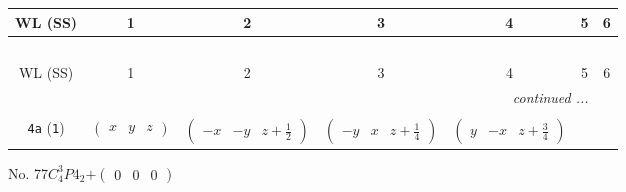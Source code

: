 \documentclass[fleqn,9pt,landscape]{jsarticle}
\begin{document}
\begin{center}
\renewcommand{\arraystretch}{1.2}
\begin{longtable}{ccccccc}
 \hline \hline
WL (SS) & 1 & 2 & 3 & 4 & 5 & 6 \\ \hline \endfirsthead

\multicolumn{6}{l}{\tablename\ \thetable{}} \\
 \hline \hline
WL (SS) & 1 & 2 & 3 & 4 & 5 & 6 \\ \hline \endhead

 \hline \hline
\multicolumn{6}{r}{\footnotesize\it continued ...} \\ \endfoot

 \hline \hline
\multicolumn{6}{r}{} \\ \endlastfoot

{\tt 4a} ({\tt 1}) & $ \begin{pmatrix} x & y & z \end{pmatrix} $ & $ \begin{pmatrix} - x & - y & z + \frac{1}{2} \end{pmatrix} $ & $ \begin{pmatrix} - y & x & z + \frac{1}{4} \end{pmatrix} $ & $ \begin{pmatrix} y & - x & z + \frac{3}{4} \end{pmatrix} $ \\
\end{longtable}
\end{center}
\newpage
No. 77\quad$C_{4}^{3}$\quad$P4_2$\quad[ tetragonal ]\quad$+\begin{pmatrix} 0 & 0 & 0 \end{pmatrix}$
\end{document}
